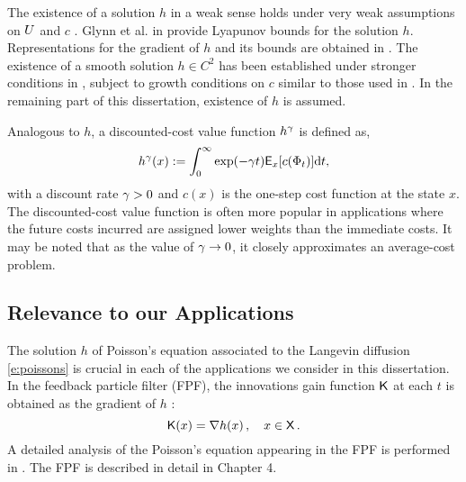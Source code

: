 The existence of a solution $h$ in a weak sense holds under very weak assumptions on $U$ and $c$  \cite{glymey96a,konmey12a}.  Glynn et al. in \cite{glymey96a} provide Lyapunov bounds for the solution $h$.  Representations for the gradient of $h$ and its bounds are obtained in \cite{laumehmeyrag15,devkonmey17b}.   The existence of  a  smooth solution $h\in C^2$ has been established under stronger conditions in \cite{parver01}, subject to growth conditions on $c$ similar to those used in  \cite{glymey96a}. In the remaining part of this dissertation, existence of $h$ is assumed. 

Analogous to $h$, a discounted-cost value function $h^\gamma$ is defined as,
\begin{equation}
h^\discount(x) := \int_0^\infty \exp(-\discount t )\Expect_x[c(\markovstate_t)] \ud t, 
\label{e:discount_value_fn}
\end{equation}
with a discount rate $\gamma  >0$ and $c(x)$ is the one-step cost function at the state $x$. The discounted-cost value function is often more popular in applications where the future costs incurred are assigned lower weights than the immediate costs. It may be noted that as the value of $\gamma \to 0$, it closely approximates an average-cost problem. 

\subsection{Relevance to our Applications} 
The solution $h$ of Poisson's equation associated to the Langevin diffusion \eqref{e:poissons} is crucial in each of the applications we consider in this dissertation. In the feedback particle filter (FPF), the innovations gain function $\text{\sf K}$ at each $t$ is obtained as  the gradient of $h$ \cite{yanmehmey13}:
\begin{equation}
\kFPF (x) = \nabla h(x)\, ,  \quad x\in\state\, .
\label{e:fpfgain}
\end{equation}
A detailed analysis of the Poisson's equation appearing in the FPF is performed in \cite{laumehmeyrag15}. The FPF is described in detail in Chapter 4. %


